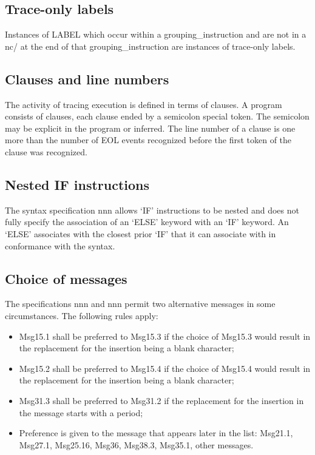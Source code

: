 \hypertarget{trace-only-labels}{%
\subsection{Trace-only labels}\label{trace-only-labels}}

Instances of LABEL which occur within a grouping\_instruction and are
not in a nc/ at the end of that grouping\_instruction are instances of
trace-only labels.

\hypertarget{clauses-and-line-numbers}{%
\subsection{Clauses and line numbers}\label{clauses-and-line-numbers}}

The activity of tracing execution is defined in terms of clauses. A
program consists of clauses, each clause ended by a semicolon special
token. The semicolon may be explicit in the program or inferred. The
line number of a clause is one more than the number of EOL events
recognized before the first token of the clause was recognized.

\hypertarget{nested-if-instructions}{%
\subsection{Nested IF instructions}\label{nested-if-instructions}}

The syntax specification nnn allows `IF' instructions to be nested and
does not fully specify the association of an `ELSE' keyword with an `IF'
keyword. An `ELSE' associates with the closest prior `IF' that it can
associate with in conformance with the syntax.

\hypertarget{choice-of-messages}{%
\subsection{Choice of messages}\label{choice-of-messages}}

The specifications nnn and nnn permit two alternative messages in some
circumstances. The following rules apply:

\begin{itemize}
\item
  Msg15.1 shall be preferred to Msg15.3 if the choice of Msg15.3 would
  result in the replacement for the insertion being a blank character;
\item
  Msg15.2 shall be preferred to Msg15.4 if the choice of Msg15.4 would
  result in the replacement for the insertion being a blank character;
\item
  Msg31.3 shall be preferred to Msg31.2 if the replacement for the
  insertion in the message starts with a period;
\item
  Preference is given to the message that appears later in the list:
  Msg21.1, Msg27.1, Msg25.16, Msg36, Msg38.3, Msg35.1, other messages.
\end{itemize}

